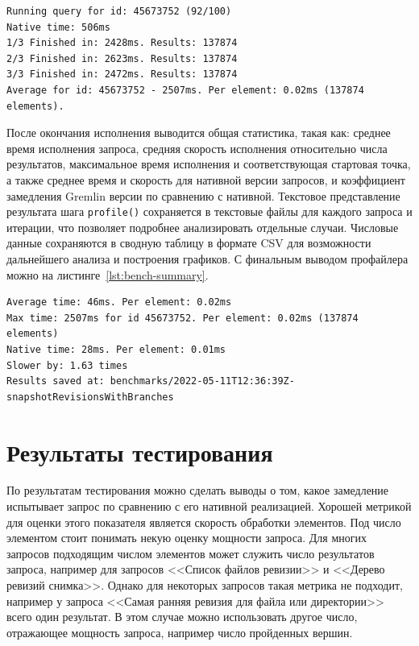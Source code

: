 \documentclass[times,specification,annotation]{itmo-student-thesis}
\begin{document}
\begin{lstlisting}[float=!h,caption={Пример промежуточного вывода профайлера},label={lst:bench-query}]
Running query for id: 45673752 (92/100)
Native time: 506ms
1/3 Finished in: 2428ms. Results: 137874
2/3 Finished in: 2623ms. Results: 137874
3/3 Finished in: 2472ms. Results: 137874
Average for id: 45673752 - 2507ms. Per element: 0.02ms (137874 elements).
\end{lstlisting}

После окончания исполнения выводится общая статистика, такая как: среднее время исполнения запроса, средняя скорость исполнения относительно числа результатов, максимальное время исполнения и соответствующая стартовая точка, а также среднее время и скорость для нативной версии запросов, и коэффициент замедления Gremlin версии по сравнению с нативной. Текстовое представление результата шага \texttt{profile()} сохраняется в текстовые файлы для каждого запроса и итерации, что позволяет подробнее анализировать отдельные случаи. Числовые данные сохраняются в сводную таблицу в формате CSV для возможности дальнейшего анализа и построения графиков. С финальным выводом профайлера можно на листинге~\ref{lst:bench-summary}.

\begin{lstlisting}[float=!h,caption={Пример финального вывода профайлера},label={lst:bench-summary}]
Average time: 46ms. Per element: 0.02ms
Max time: 2507ms for id 45673752. Per element: 0.02ms (137874 elements)
Native time: 28ms. Per element: 0.01ms
Slower by: 1.63 times
Results saved at: benchmarks/2022-05-11T12:36:39Z-snapshotRevisionsWithBranches
\end{lstlisting}

\section{Результаты тестирования}

По результатам тестирования можно сделать выводы о том, какое замедление испытывает запрос по сравнению с его нативной реализацией. Хорошей метрикой для оценки этого показателя является скорость обработки элементов. Под число элементом стоит понимать некую оценку мощности запроса. Для многих запросов подходящим числом элементов может служить число результатов запроса, например для запросов <<Список файлов ревизии>> и <<Дерево ревизий снимка>>. Однако для некоторых запросов такая метрика не подходит, например у запроса <<Самая ранняя ревизия для файла или директории>> всего один результат. В этом случае можно использовать другое число, отражающее мощность запроса, например число пройденных вершин.
\end{document}
